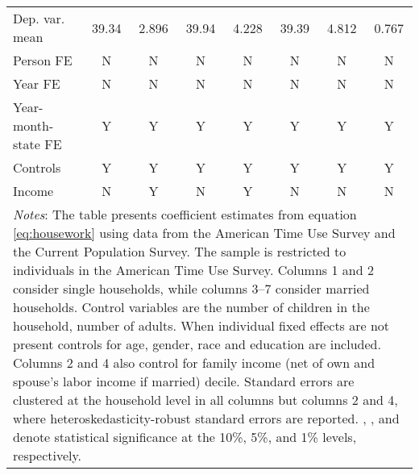 {\begin{tabular}{l*{7}{c}}
Dep. var. mean      &       39.34         &       2.896         &       39.94         &       4.228         &       39.39         &       4.812         &       0.767         \\
Person FE           &           N         &           N         &           N         &           N         &           N         &           N         &           N         \\
Year FE             &           N         &           N         &           N         &           N         &           N         &           N         &           N         \\
Year-month-state FE &           Y         &           Y         &           Y         &           Y         &           Y         &           Y         &           Y         \\
Controls            &           Y         &           Y         &           Y         &           Y         &           Y         &           Y         &           Y         \\
Income              &           N         &           Y         &           N         &           Y         &           N         &           N         &           N         \\
\bottomrule
\multicolumn{8}{p{17cm}}{\footnotesize \textit{Notes}: The table presents coefficient estimates from equation \ref{eq:housework} using data from the American Time Use Survey and the Current Population Survey. The sample is restricted to individuals in the American Time Use Survey. Columns 1 and 2 consider single households, while columns 3--7 consider married households. Control variables are the number of children in the household, number of adults. When individual fixed effects are not present controls for age, gender, race and education are included. Columns 2 and 4 also control for family income (net of own and spouse's labor income if married) decile. Standard errors are clustered at the household level in all columns but columns 2 and 4, where heteroskedasticity-robust standard errors are reported. \sym{*}, \sym{**}, and \sym{***} denote statistical significance at the 10\%, 5\%, and 1\% levels, respectively.}\\
\end{tabular}
}
